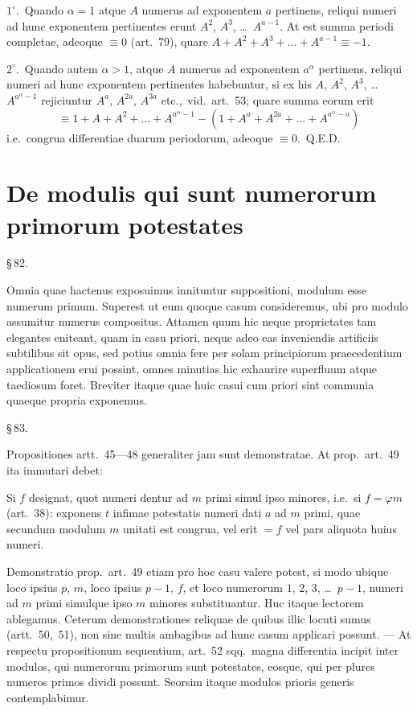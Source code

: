 \documentclass[12pt,a4paper]{article}
\theoremstyle{plain}
\theoremstyle{definition}
\theoremstyle{remark}
\begin{document}
$1^\circ$.\ Quando $\alpha = 1$ atque $A$ numerus ad exponentem $a$ pertinens, reliqui numeri ad hunc exponentem pertinentes erunt $A^2$, $A^3$, \dots\ $A^{a-1}$. At est summa periodi completae, adeoque $\equiv 0$ (art.~79), quare $A + A^2 + A^3 + \dots + A^{a-1} \equiv -1$.

$2^\circ$.\ Quando autem $\alpha > 1$, atque $A$ numerus ad exponentem $a^\alpha$ pertinens, reliqui numeri ad hunc exponentem pertinentes habebuntur, si ex his $A$, $A^2$, $A^3$, \dots\ $A^{a^\alpha - 1}$ rejiciuntur $A^a$, $A^{2a}$, $A^{3a}$ etc.,\ vid.\ art.~53; quare summa eorum erit
\[
\equiv 1 + A + A^2 + \dots + A^{a^\alpha - 1} - (1 + A^a + A^{2a} + \dots + A^{a^\alpha - a})
\]
i.e.\ congrua differentiae duarum periodorum, adeoque $\equiv 0$.\ Q.E.D.

\section*{De modulis qui sunt numerorum primorum potestates}

\begin{center}\S\,82.\end{center}

Omnia quae hactenus exposuimus innituntur suppositioni, modulum esse numerum primum. Superest ut eum quoque casum consideremus, ubi pro modulo assumitur numerus compositus. Attamen quum hic neque proprietates tam elegantes eniteant, quam in casu priori, neque adeo eas inveniendis artificiis subtilibus sit opus, sed potius omnia fere per solam principiorum praecedentium applicationem erui possint, omnes minutias hic exhaurire superfluum atque taediosum foret. Breviter itaque quae huic casui cum priori sint communia quaeque propria exponemus.

\begin{center}\S\,83.\end{center}

Propositiones artt.~45---48 generaliter jam sunt demonstratae. At prop.\ art.~49 ita immutari debet:

Si $f$ designat, quot numeri dentur ad $m$ primi simul ipso minores, i.e.\ si $f = \varphi m$ (art.~38): exponens $t$ infimae potestatis numeri dati $a$ ad $m$ primi, quae secundum modulum $m$ unitati est congrua, vel erit $= f$ vel pars aliquota huius numeri.

Demonstratio prop.\ art.~49 etiam pro hoc casu valere potest, si modo ubique loco ipsius $p$, $m$, loco ipsius $p-1$, $f$, et loco numerorum $1$, $2$, $3$, \dots\ $p-1$, numeri ad $m$ primi simulque ipso $m$ minores substituantur. Huc itaque lectorem ablegamus. Ceterum demonstrationes reliquae de quibus illic locuti sumus (artt.~50,~51), non sine multis ambagibus ad hunc casum applicari possunt. --- At respectu propositionum sequentium, art.~52 sqq.\ magna differentia incipit inter modulos, qui numerorum primorum sunt potestates, eosque, qui per plures numeros primos dividi possunt. Seorsim itaque modulos prioris generis contemplabimur.
\end{document}
